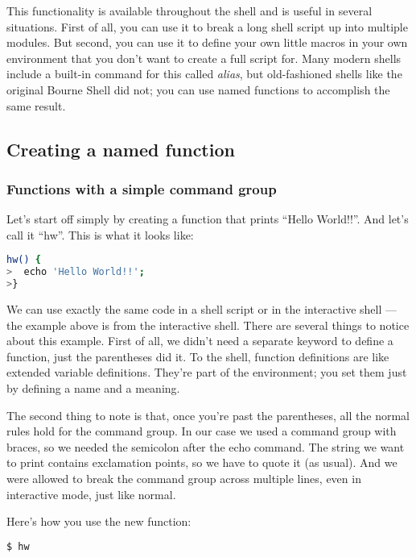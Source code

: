 This functionality is available throughout the shell and is useful in several
situations. First of all, you can use it to break a long shell script up into
multiple modules. But second, you can use it to define your own little macros
in your own environment that you don't want to create a full script for. Many
modern shells include a built-in command for this called \emph{alias}, but
old-fashioned shells like the original Bourne Shell did not; you can use named
functions to accomplish the same result.

\subsection{Creating a named function}
\subsubsection{Functions with a simple command group}
Let's start off simply by creating a function that prints ``Hello World!!''.
And let's call it ``hw''. This is what it looks like:

\lstset{basicstyle=\scriptsize, numbers=left, captionpos=b, tabsize=4}
\begin{lstlisting}[caption=Hello world as a named function,language={bash},
breaklines=true,xleftmargin=15pt,label=lst:Hello world as a named function]
hw() {
>  echo 'Hello World!!';
>}
\end{lstlisting}

We can use exactly the same code in a shell script or in the interactive shell
--- the example above is from the interactive shell. There are several things
to notice about this example. First of all, we didn't need a separate keyword
to define a function, just the parentheses did it. To the shell, function
definitions are like extended variable definitions. They're part of the
environment; you set them just by defining a name and a meaning.

The second thing to note is that, once you're past the parentheses, all the
normal rules hold for the command group. In our case we used a command group
with braces, so we needed the semicolon after the echo command. The string we
want to print contains exclamation points, so we have to quote it (as usual).
And we were allowed to break the command group across multiple lines, even in
interactive mode, just like normal.

Here's how you use the new function:
\lstset{basicstyle=\scriptsize, numbers=left, captionpos=b, tabsize=4}
\begin{lstlisting}[caption=Calling our function,language={bash},
breaklines=true,xleftmargin=15pt,label=lst:Calling our function]
$ hw
\end{lstlisting}


